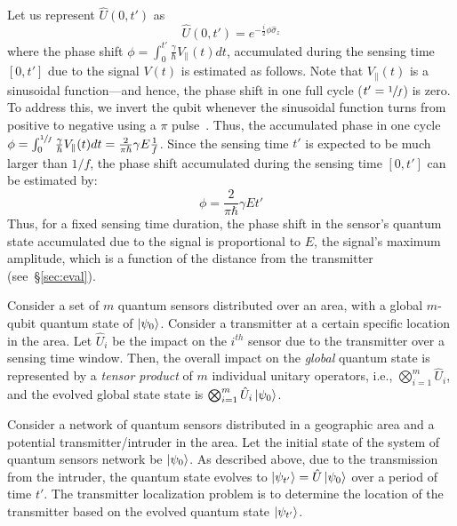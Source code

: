 Let us represent $\hat{U}(0, t')$ as~\cite{nature21_phase,Zhang_2021}
\begin{equation}
    \hat{U}(0, t') = e^{-\frac{i}{2} \phi  \hat{\sigma}_z} \label{eqn:unitary}
\end{equation}
where the phase shift $\phi  =  \int_{0}^{t'} \frac{\gamma}{\hbar} V_{\parallel}(t) dt$, 
accumulated during the sensing time $[0, t']$ due to the signal $V(t)$ is estimated as follows.
Note that $V_{\parallel}(t)$ is a sinusoidal function---and hence, the phase shift in
one full cycle ($t' =\sfrac{1}{f}$) is zero. To address this, we invert the qubit whenever the sinusoidal function turns from positive to negative using a $\pi$ pulse~\cite{RevModPhys.quantumsensing}.
Thus, the accumulated phase in one cycle $\phi = \int_{0}^{\sfrac{1}{f}} \frac{\gamma}{\hbar} V_{\parallel}(t) dt = \frac{2}{\pi \hbar} \gamma E \frac{1}{f}$.
Since the sensing time $t'$ is expected to be much larger than $1/f$, the phase
shift accumulated during the sensing time $[0, t']$ can be estimated by:
\begin{equation}
    \phi =  \frac{2}{\pi \hbar} \gamma E t'
    \label{eqn:phase_shift}
\end{equation}
Thus, for a fixed sensing time duration, the phase shift in the sensor's quantum state
accumulated due to the signal is proportional to $E$, the signal's maximum amplitude, which is a function of the distance from the transmitter (see~\S\ref{sec:eval}). 

Consider a set of $m$ quantum sensors distributed over an area, with a global $m$-qubit quantum state of $\ket{\psi_0}$. 
Consider a transmitter at a certain specific location in the area. 
Let $\hat{U}_i$ be
the impact on the $i^{th}$ sensor due to the transmitter over a sensing time window. 
Then, the overall impact on the {\em global} quantum state is represented by a \emph{tensor product}  of $m$ individual unitary operators, i.e., $\bigotimes_{i=1}^{m} \hat{U}_i$, and
the evolved global state state is $\bigotimes_{i=1}^{m} \hat{U}_i\ket{\psi_0}$. 

Consider a network of quantum sensors distributed in a geographic area 
and a potential transmitter/intruder in the area.
Let the initial state of the system of quantum sensors network 
be $\ket{\psi_{0}}$. 
As described above, due to the transmission from the intruder, the quantum state evolves to $\ket{\psi_{t'}} = \hat{U} \ket{\psi_{0}}$ over a period of time $t'$.
The transmitter localization problem is to determine the location of the transmitter based on
the evolved quantum state $\ket{\psi_{t'}}$.

